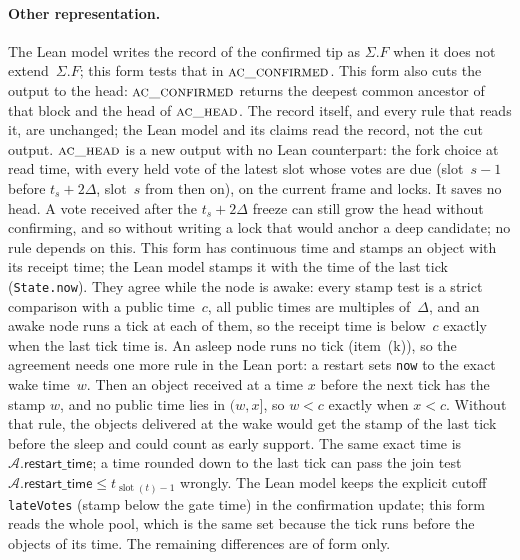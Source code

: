 \documentclass{article}
\newcommand{\slot}{\operatorname{slot}}
\newcommand{\AC}{\mathcal A}
\newcommand{\restartTime}{\mathsf{restart\_time}}
\begin{document}
\paragraph{Other representation.}
The Lean model writes the record of the confirmed tip as $\Sigma.F$ when
it does not extend~$\Sigma.F$; this form tests that in
$\Call{ac\_confirmed}{}$.  This form also cuts the output to the head:
$\Call{ac\_confirmed}{}$ returns the deepest common ancestor of that block
and the head of $\Call{ac\_head}{}$.  The record itself, and every rule that
reads it, are unchanged; the Lean model and its claims read the record,
not the cut output.  $\Call{ac\_head}{}$ is a new output with no Lean
counterpart: the fork choice at read time, with every held vote of the
latest slot whose votes are due (slot~$s-1$ before $t_s+2\Delta$, slot~$s$
from then on), on the current frame and locks.  It saves no head.
A vote received after the $t_s+2\Delta$ freeze can still grow the head
without confirming, and so without writing a lock that would anchor a deep
candidate; no rule depends on this.
This form has continuous time and stamps an object with its receipt
time; the Lean model stamps it with the time of the last tick
(\texttt{State.now}).  They agree while the node is awake: every stamp
test is a strict comparison with a public time~$c$, all public times are
multiples of~$\Delta$, and an awake node runs a tick at each of them, so
the receipt time is below~$c$ exactly when the last tick time is.  An
asleep node runs no tick (item~(k)), so the agreement needs one more rule
in the Lean port: a restart sets \texttt{now} to the exact wake time~$w$.
Then an object received at a time $x$ before the next tick has the stamp
$w$, and no public time lies in $(w,x]$, so $w<c$ exactly when $x<c$.
Without that rule, the objects delivered at the wake would get the stamp
of the last tick before the sleep and could count as early support.  The
same exact time is $\AC.\restartTime$; a time rounded down to the last
tick can pass the join test $\AC.\restartTime\leq t_{\slot(t)-1}$ wrongly.
The Lean model keeps the explicit cutoff \texttt{lateVotes} (stamp below
the gate time) in the confirmation update; this form reads the whole
pool, which is the same set because the tick runs before the objects of
its time.
The remaining differences are of form only.
\end{document}
